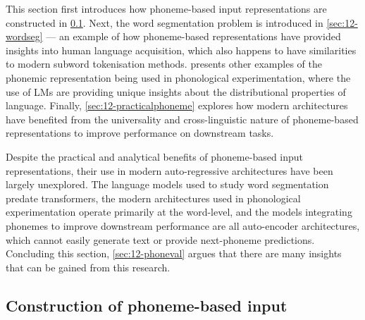 
This section first introduces how phoneme-based input representations are constructed in \cref{sec:12-implementphoneme}. Next, the word segmentation problem is introduced in \cref{sec:12-wordseg} --- an example of how phoneme-based representations have provided insights into human language acquisition, which also happens to have similarities to modern subword tokenisation methods.  presents other examples of the phonemic representation being used in phonological experimentation, where the use of LMs are providing unique insights about the distributional properties of language. Finally, \cref{sec:12-practicalphoneme} explores how modern architectures have benefited from the universality and cross-linguistic nature of phoneme-based representations to improve performance on downstream tasks.

Despite the practical and analytical benefits of phoneme-based input representations, their use in modern auto-regressive architectures have been largely unexplored. The language models used to study word segmentation predate transformers, the modern architectures used in phonological experimentation operate primarily at the word-level, and the models integrating phonemes to improve downstream performance are all auto-encoder architectures, which cannot easily generate text or provide next-phoneme predictions. Concluding this section, \cref{sec:12-phoneval} argues that there are many insights that can be gained from this research.


\subsection{Construction of phoneme-based input}\label{sec:12-implementphoneme}

